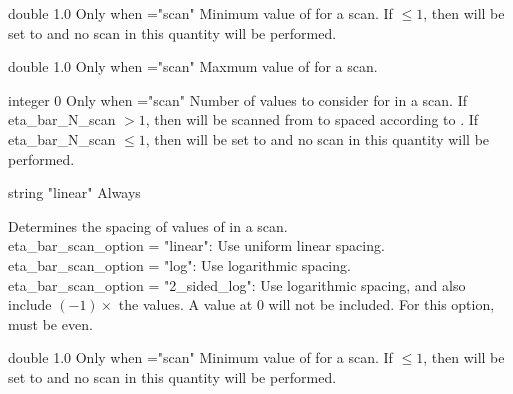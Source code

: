 \myhrule

{double}
{1.0}
{Only when ={\ttfamily "scan"}}
{Minimum value of  for a scan. If $\le 1$, then  will be set to  and no scan in this quantity will be performed.
}

\myhrule

{double}
{1.0}
{Only when ={\ttfamily "scan"}}
{Maxmum value of  for a scan.
}

\myhrule

{integer}
{0}
{Only when ={\ttfamily "scan"}}
{Number of values to consider for  in a scan. If {\ttfamily eta\_bar\_N\_scan} $>1$, then  will be scanned from  to  spaced according to .
If {\ttfamily eta\_bar\_N\_scan} $\le 1$, then  will be set to  and no scan in
this quantity will be performed.
}

\myhrule

{string}
{{\ttfamily "linear"}}
{Always}
{Determines the spacing of values of  in a scan.\\

{\ttfamily eta\_bar\_scan\_option} = {\ttfamily "linear"}: Use uniform linear spacing.\\

{\ttfamily eta\_bar\_scan\_option} = {\ttfamily "log"}: Use logarithmic spacing.\\

{\ttfamily eta\_bar\_scan\_option} = {\ttfamily "2\_sided\_log"}: Use logarithmic spacing, and also include $(-1)\times$ the values. A value at 0 will not be included. For this option,  must be even.

}

\myhrule

{double}
{1.0}
{Only when ={\ttfamily "scan"}}
{Minimum value of  for a scan. If $\le 1$, then  will be set to  and no scan in this quantity will be performed.
}

\myhrule

